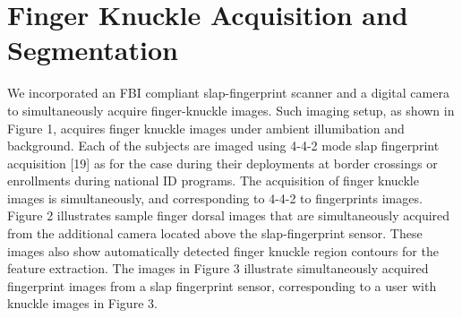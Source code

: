\section{Finger Knuckle Acquisition and Segmentation}

We incorporated an FBI compliant slap-fingerprint scanner and a digital camera to simultaneously acquire finger-knuckle images. Such imaging setup, as shown in Figure 1, acquires finger knuckle images under ambient illumibation and background. Each of the subjects are imaged using 4-4-2 mode slap fingerprint acquisition [19] as for the case during their deployments at border crossings or enrollments during national ID programs. The acquisition of finger knuckle images is simultaneously, and corresponding to 4-4-2 to fingerprints images. Figure 2 illustrates sample finger dorsal images that are simultaneously acquired from the additional camera located above the slap-fingerprint sensor. These images also show automatically detected finger knuckle region contours for the feature extraction. The images in Figure 3 illustrate simultaneously acquired fingerprint images from a slap fingerprint sensor, corresponding to a user with knuckle images in Figure 3.


